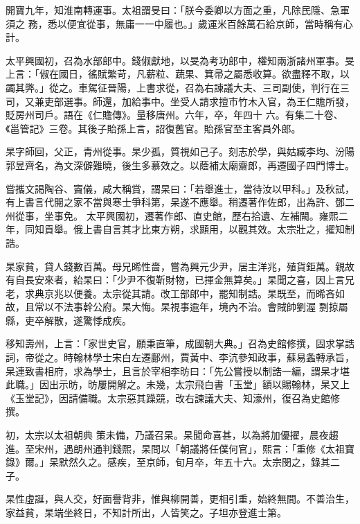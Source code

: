 \begin{pinyinscope}
 開寶九年，知淮南轉運事。太祖謂旻曰：「朕今委卿以方面之重，凡除民隱、急軍須之
 務，悉以便宜從事，無庸一一中履也。」歲運米百餘萬石給京師，當時稱有心計。



 太平興國初，召為水部郎中。錢俶獻地，以旻為考功郎中，權知兩浙諸州軍事。旻上言：「俶在國日，徭賦繁苛，凡薪粒、蔬果、箕帚之屬悉收算。欲盡釋不取，以蠲其弊。」從之。車駕征晉陽，上書求從，召為右諫議大夫、三司副使，判行在三司，又兼吏部選事。師還，加給事中。坐受人請求擅市竹木入官，為王仁贍所發，貶房州司戶。語在《仁贍傳》。量移唐州。六年，卒，年四十
 六。有集二十卷、《邕管記》三卷。其後子貽孫上言，詔復舊官。貽孫官至主客員外郎。



 杲字師回，父正，青州從事。杲少孤，質視如己子。刻志於學，與姑臧李均、汾陽郭昱齊名，為文深僻難曉，後生多慕效之。以蔭補太廟齋郎，再遷國子四門博士。



 嘗攜文謁陶谷、竇儀，咸大稱賞，謂杲曰：「若舉進士，當待汝以甲科。」及秋試，有上書言代閱之家不當與寒士爭科第，杲遂不應舉。稍遷著作佐郎，出為許、鄧二州從事，坐事免。
 太平興國初，遷著作郎、直史館，歷右拾遺、左補闕。雍熙二年，同知貢舉。俄上書自言其才比東方朔，求顯用，以觀其效。太宗壯之，擢知制誥。



 杲家貧，貸人錢數百萬。母兄晞性嗇，嘗為興元少尹，居主洋兆，殖貨鉅萬。親故有自長安來者，紿杲曰：「少尹不復靳財物，已揮金無算矣。」杲聞之喜，因上言兄老，求典京兆以便養。太宗從其請。改工部郎中，罷知制誥。杲既至，而晞吝如故，且常以不法事幹公府。杲大悔。杲視事逾年，境內不治。會賊帥劉渥
 剽掠屬縣，吏卒解散，遂驚悸成疾。



 移知壽州，上言：「家世史官，願秉直筆，成國朝大典。」召為史館修撰，固求掌誥詞，帝從之。時翰林學士宋白左遷鄜州，賈黃中、李沆參知政事，蘇易螽轉承旨，杲連致書相府，求為學士，且言於宰相李昉曰：「先公嘗授以制誥一編，謂杲才堪此職。」因出示昉，昉屢開解之。未幾，太宗飛白書「玉堂」額以賜翰林，杲又上《玉堂記》，因請備職。太宗惡其躁競，改右諫議大夫、知濠州，復召為史館修撰。



 初，太宗以太祖朝典
 策未備，乃議召杲。杲聞命喜甚，以為將加優擢，晨夜趨進。至宋州，遇朗州通判錢熙，杲問以「朝議將任僕何官」，熙言：「重修《太祖寶錄》爾。」杲默然久之。感疾，至京師，旬月卒，年五十六。太宗閔之，錄其二子。



 杲性虛誕，與人交，好面譽背非，惟與柳開善，更相引重，始終無間。不善治生，家益貧，杲端坐終日，不知計所出，人皆笑之。子坦亦登進士第。




\end{pinyinscope}

